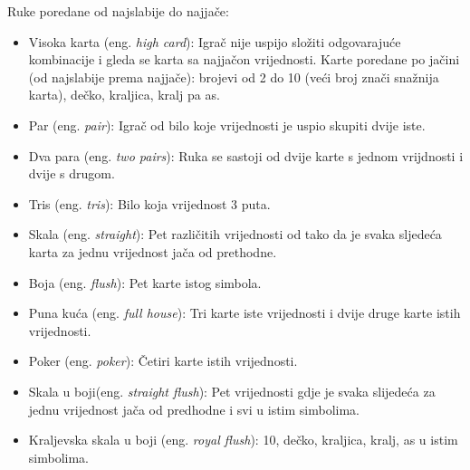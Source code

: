 Ruke poredane od najslabije do najjače:
\begin{itemize}
	\item Visoka karta (eng. \textit{high card}): Igrač nije uspijo složiti odgovarajuće kombinacije i gleda se karta sa najjačon vrijednosti. Karte poredane po jačini (od najslabije prema najjače):
	brojevi od 2 do 10 (veći broj znači snažnija karta), dečko, kraljica, kralj pa as.
	
	\item Par (eng. \textit{pair}): Igrač od bilo koje vrijednosti je uspio skupiti dvije iste.
	\item Dva para (eng. \textit{two pairs}): Ruka se sastoji od dvije karte s jednom vrijdnosti i dvije s drugom.
	\item Tris (eng. \textit{tris}): Bilo koja vrijednost 3 puta.
	\item Skala (eng. \textit{straight}): Pet različitih vrijednosti od tako da je svaka sljedeća karta za jednu vrijednost jača od prethodne.
	
	\item Boja (eng. \textit{flush}): Pet karte istog simbola.
	\item Puna kuća (eng. \textit{full house}): Tri karte iste vrijednosti i dvije druge karte istih vrijednosti.
	\item Poker (eng. \textit{poker}): Četiri karte istih vrijednosti.
	\item Skala u boji(eng. \textit{straight flush}): Pet vrijednosti gdje je svaka slijedeća za jednu vrijednost jača od predhodne i svi u istim simbolima.
	
	\item Kraljevska skala u boji (eng. \textit{royal flush}): 10, dečko, kraljica, kralj, as u istim simbolima.
\end{itemize}

